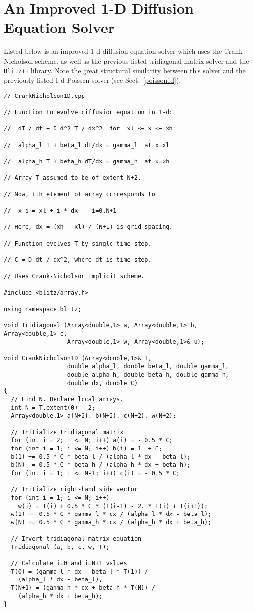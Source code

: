 \section{An Improved 1-D Diffusion Equation Solver}
Listed below is an improved 1-d diffusion equation solver which uses the Crank-Nicholson
scheme, as well as the previous listed tridiagonal matrix solver and the {\tt Blitz++}
library. Note the great structural similarity between this solver and the previously listed
1-d Poisson solver (see Sect.~\ref{poisson1d}).
{\small\begin{verbatim}
// CrankNicholson1D.cpp

// Function to evolve diffusion equation in 1-d:

//  dT / dt = D d^2 T / dx^2  for  xl <= x <= xh

//  alpha_l T + beta_l dT/dx = gamma_l  at x=xl

//  alpha_h T + beta_h dT/dx = gamma_h  at x=xh

// Array T assumed to be of extent N+2.

// Now, ith element of array corresponds to

//  x_i = xl + i * dx    i=0,N+1

// Here, dx = (xh - xl) / (N+1) is grid spacing.

// Function evolves T by single time-step.

// C = D dt / dx^2, where dt is time-step.

// Uses Crank-Nicholson implicit scheme.

#include <blitz/array.h>

using namespace blitz;

void Tridiagonal (Array<double,1> a, Array<double,1> b, Array<double,1> c, 
                  Array<double,1> w, Array<double,1>& u);

void CrankNicholson1D (Array<double,1>& T, 
                  double alpha_l, double beta_l, double gamma_l,
                  double alpha_h, double beta_h, double gamma_h,
                  double dx, double C)
{
  // Find N. Declare local arrays.
  int N = T.extent(0) - 2;
  Array<double,1> a(N+2), b(N+2), c(N+2), w(N+2);

  // Initialize tridiagonal matrix
  for (int i = 2; i <= N; i++) a(i) = - 0.5 * C;
  for (int i = 1; i <= N; i++) b(i) = 1. + C;
  b(1) += 0.5 * C * beta_l / (alpha_l * dx - beta_l);
  b(N) -= 0.5 * C * beta_h / (alpha_h * dx + beta_h);
  for (int i = 1; i <= N-1; i++) c(i) = - 0.5 * C;

  // Initialize right-hand side vector
  for (int i = 1; i <= N; i++)
    w(i) = T(i) + 0.5 * C * (T(i-1) - 2. * T(i) + T(i+1));
  w(1) += 0.5 * C * gamma_l * dx / (alpha_l * dx - beta_l);
  w(N) += 0.5 * C * gamma_h * dx / (alpha_h * dx + beta_h);

  // Invert tridiagonal matrix equation
  Tridiagonal (a, b, c, w, T);

  // Calculate i=0 and i=N+1 values
  T(0) = (gamma_l * dx - beta_l * T(1)) /
    (alpha_l * dx - beta_l);
  T(N+1) = (gamma_h * dx + beta_h * T(N)) /
    (alpha_h * dx + beta_h);
}
\end{verbatim}}

